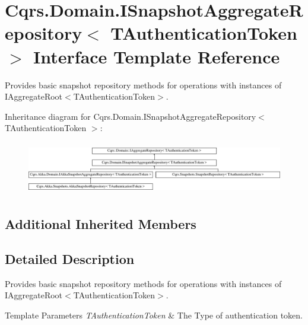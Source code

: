 \hypertarget{interfaceCqrs_1_1Domain_1_1ISnapshotAggregateRepository}{}\section{Cqrs.\+Domain.\+I\+Snapshot\+Aggregate\+Repository$<$ T\+Authentication\+Token $>$ Interface Template Reference}
\label{interfaceCqrs_1_1Domain_1_1ISnapshotAggregateRepository}


Provides basic snapshot repository methods for operations with instances of I\+Aggregate\+Root$<$\+T\+Authentication\+Token$>$.  


Inheritance diagram for Cqrs.\+Domain.\+I\+Snapshot\+Aggregate\+Repository$<$ T\+Authentication\+Token $>$\+:\begin{figure}[H]
\begin{center}
\leavevmode
\includegraphics[height=2.357895cm]{interfaceCqrs_1_1Domain_1_1ISnapshotAggregateRepository}
\end{center}
\end{figure}
\subsection*{Additional Inherited Members}


\subsection{Detailed Description}
Provides basic snapshot repository methods for operations with instances of I\+Aggregate\+Root$<$\+T\+Authentication\+Token$>$. 


\begin{DoxyTemplParams}{Template Parameters}
{\em T\+Authentication\+Token} & The Type of authentication token.\\
\hline
\end{DoxyTemplParams}
